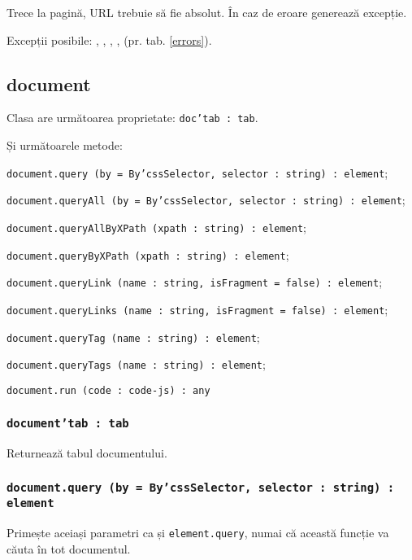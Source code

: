 Trece la pagină, URL trebuie să fie absolut. În caz de eroare generează excepție.

Excepții posibile: , , , ,  (pr. tab. \ref{errors}).

\subsection{document}

Clasa \dom{} are următoarea proprietate: \texttt{doc'tab : tab}.

Și următoarele metode:
\begin{icItems}
	\item \texttt{document.query (by = By'cssSelector, selector : string) : element};
	\item \texttt{document.queryAll (by = By'cssSelector, selector : string) : element};
	\item \texttt{document.queryAllByXPath (xpath : string) : element};
	\item \texttt{document.queryByXPath (xpath : string) : element};
	\item \texttt{document.queryLink (name : string, isFragment = false) : element};
	\item \texttt{document.queryLinks (name : string, isFragment = false) : element};
	\item \texttt{document.queryTag (name : string) : element};
	\item \texttt{document.queryTags (name : string) : element};
	\item \texttt{document.run (code : code-js) : any}
\end{icItems}

\subsubsection{\texttt{document'tab : tab}}

Returnează tabul documentului.

\subsubsection{\texttt{document.query (by = By'cssSelector, selector : string) : element}}

Primește aceiași parametri ca și  \texttt{element.query}, numai că această funcție va căuta în tot documentul.

